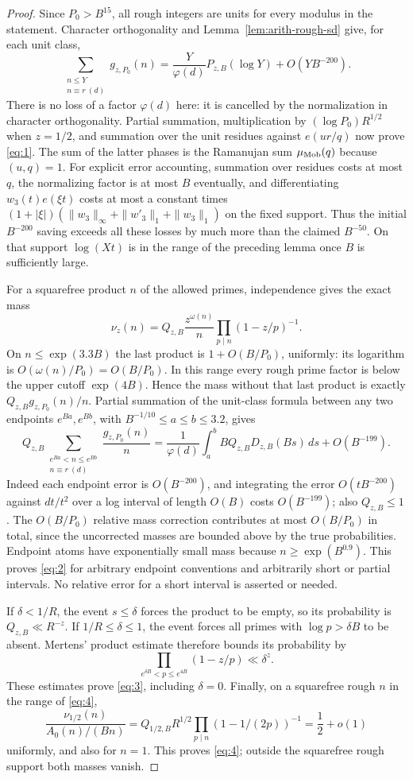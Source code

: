 \begin{proof}
Since $P_0>B^{15}$, all rough integers are units for every modulus in the
statement.  Character orthogonality and
Lemma~\ref{lem:arith-rough-sd} give, for each unit class,
\[
 \sum_{\substack{n\le Y\\n\equiv r\ (d)}}g_{z,P_0}(n)
 =\frac{Y}{\varphi(d)}P_{z,B}(\log Y)+O(YB^{-200}).
\]
There is no loss of a factor $\varphi(d)$ here: it is cancelled by the
normalization in character orthogonality.  Partial summation, multiplication
by $(\log P_0)R^{1/2}$ when $z=1/2$, and summation over the unit residues
against $e(ur/q)$ now prove \eqref{eq:1}.  The sum of the latter phases is
the Ramanujan sum $\mu_{\rm Mob}(q)$ because $(u,q)=1$.
For explicit error accounting, summation over residues costs at most $q$,
the normalizing factor is at most $B$ eventually, and differentiating
$w_3(t)e(\xi t)$ costs at most a constant times
$(1+|\xi|)(\|w_3\|_\infty+\|w'_3\|_1+\|w_3\|_1)$ on the fixed support.
Thus the initial $B^{-200}$ saving exceeds all these losses by much more
than the claimed $B^{-50}$.  On that support $\log(Xt)$ is in the range of
the preceding lemma once $B$ is sufficiently large.

For a squarefree product $n$ of the allowed primes, independence gives the
exact mass
\[
 \nu_z(n)=Q_{z,B}\frac{z^{\omega(n)}}n
                     \prod_{p\mid n}(1-z/p)^{-1}.
\]
On $n\le\exp(3.3B)$ the last product is $1+O(B/P_0)$, uniformly: its
logarithm is $O(\omega(n)/P_0)=O(B/P_0)$.
In this range every rough prime factor is below the upper cutoff
$\exp(4B)$.  Hence the mass without that last product is exactly
$Q_{z,B}g_{z,P_0}(n)/n$.  Partial summation of the unit-class formula between
any two endpoints $e^{Ba},e^{Bb}$, with
$B^{-1/10}\le a\le b\le3.2$, gives
\[
 Q_{z,B}\sum_{\substack{e^{Ba}<n\le e^{Bb}\\n\equiv r\ (d)}}
       \frac{g_{z,P_0}(n)}n
 =\frac1{\varphi(d)}\int_a^b BQ_{z,B}D_{z,B}(Bs)\,ds
       +O(B^{-199}).
\]
Indeed each endpoint error is $O(B^{-200})$, and integrating the error
$O(tB^{-200})$ against $dt/t^2$ over a log interval of length $O(B)$ costs
$O(B^{-199})$; also $Q_{z,B}\le1$.
The $O(B/P_0)$ relative mass correction contributes at most $O(B/P_0)$ in
total, since the uncorrected masses are bounded above by the true
probabilities.  Endpoint atoms have exponentially small mass because
$n\ge\exp(B^{0.9})$.  This proves \eqref{eq:2} for arbitrary endpoint
conventions and arbitrarily short or partial intervals.  No relative error
for a short interval is asserted or needed.

If $\delta<1/R$, the event $s\le\delta$ forces the product to be empty, so
its probability is $Q_{z,B}\ll R^{-z}$.  If $1/R\le\delta\le1$, the event
forces all primes with $\log p>\delta B$ to be absent.  Mertens' product
estimate therefore bounds its probability by
\[
 \prod_{e^{\delta B}<p\le e^{4B}}(1-z/p)\ll\delta^z.
\]
These estimates prove \eqref{eq:3}, including $\delta=0$.
Finally, on a squarefree rough $n$ in the range of \eqref{eq:4},
\[
 \frac{\nu_{1/2}(n)}{A_0(n)/(Bn)}
 =Q_{1/2,B}R^{1/2}\prod_{p\mid n}(1-1/(2p))^{-1}
 =\frac12+o(1)
\]
uniformly, and also for $n=1$.  This proves \eqref{eq:4}; outside the
squarefree rough support both masses vanish.
\end{proof}

